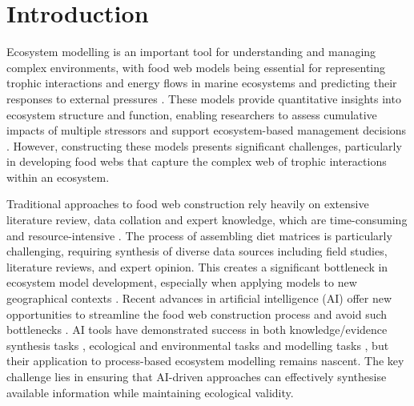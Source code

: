 \section{Introduction}

Ecosystem modelling is an important tool for understanding and managing complex environments, with food web models being essential for representing trophic interactions and energy flows in marine ecosystems and predicting their responses to external pressures \citep{Christensen2004, Colleter2015,audzijonyte2019atlantis}. These models provide quantitative insights into ecosystem structure and function, enabling researchers to assess cumulative impacts of multiple stressors and support ecosystem-based management decisions \citep{Coll2015, Villasante2016,Geary2020}. However, constructing these models presents significant challenges, particularly in developing food webs that capture the complex web of trophic interactions within an ecosystem.

Traditional approaches to food web construction rely heavily on extensive literature review, data collation and expert knowledge, which are time-consuming and resource-intensive \citep{Holden2024a}. The process of assembling diet matrices is particularly challenging, requiring synthesis of diverse data sources including field studies, literature reviews, and expert opinion. This creates a significant bottleneck in ecosystem model development, especially when applying models to new geographical contexts \citep{Holden2024b}. Recent advances in artificial intelligence (AI) offer new opportunities to streamline the food web construction process and avoid such bottlenecks \citep{spilliasfuture}. AI tools have demonstrated success in both knowledge/evidence synthesis tasks \citep{spillias2024human,keck2025extracting,castro2024large,spillias2024evaluating,Zheng2023,nugraha2024traditional}, ecological and environmental tasks \citep{Fernandes2024,Li2024,Chen2024,dorm2025large,Noleto2024} and modelling tasks \citep{Lapeyrolerie2022, Tuia2022, Karniadakis2021}, but their application to process-based ecosystem modelling remains nascent. The key challenge lies in ensuring that AI-driven approaches can effectively synthesise available information while maintaining ecological validity.

